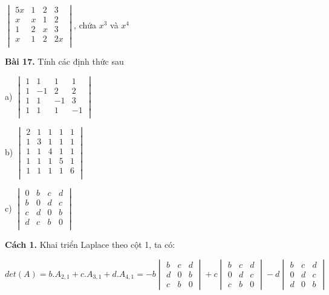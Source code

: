 \documentclass[12pt]{report}
\begin{document}
$\begin{vmatrix}
	5x & 1 & 2 & 3 \\
	x & x & 1 & 2 \\
	1 & 2 & x & 3 \\
	x & 1 & 2 & 2x \\
\end{vmatrix}$, chứa $x^3$ và $x^4$

\textbf{Bài 17.} Tính các định thức sau

a) $\begin{vmatrix}
	1 & 1 & 1 & 1 \\
	1 & -1 & 2 & 2 \\
	1 & 1 & -1 & 3 \\
	1 & 1 & 1 & -1 \\
\end{vmatrix}$

b) $\begin{vmatrix}
	2 & 1 & 1 & 1 & 1 \\
	1 & 3 & 1 & 1 & 1 \\
	1 & 1 & 4 & 1 & 1 \\
	1 & 1 & 1 & 5 & 1 \\
	1 & 1 & 1 & 1 & 6 \\
\end{vmatrix}$

c) $\begin{vmatrix}
0 & b & c & d \\
b & 0 & d & c \\
c & d & 0 & b \\
d & c & b & 0 \\
\end{vmatrix}$

\textbf{Cách 1.} Khai triển Laplace theo cột 1, ta có:

$det(A) = b.A_{2,1} + c.A_{3,1} + d.A_{4,1} = -b\begin{vmatrix}
b & c & d \\
d & 0 & b \\
c & b & 0
\end{vmatrix} + c\begin{vmatrix}
b & c & d \\
0 & d & c \\
c & b & 0
\end{vmatrix} - d\begin{vmatrix}
b & c & d \\
0 & d & c \\
d & 0 & b
\end{vmatrix}$
\end{document}

